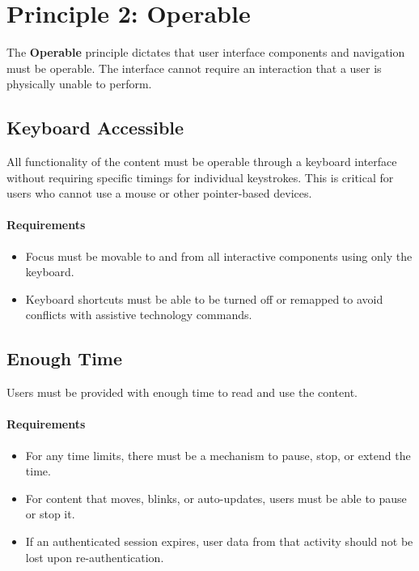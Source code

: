\documentclass{scrbook}
\begin{document}
\section{Principle 2: Operable}

The \textbf{Operable} principle dictates that user interface components and navigation must be operable. The interface cannot require an interaction that a user is physically unable to perform.

\subsection{Keyboard Accessible}
All functionality of the content must be operable through a keyboard interface without requiring specific timings for individual keystrokes. This is critical for users who cannot use a mouse or other pointer-based devices.

\paragraph{Requirements}
\begin{itemize}
    \item Focus must be movable to and from all interactive components using only the keyboard.
    \item Keyboard shortcuts must be able to be turned off or remapped to avoid conflicts with assistive technology commands.
\end{itemize}

\subsection{Enough Time}
Users must be provided with enough time to read and use the content.

\paragraph{Requirements}
\begin{itemize}
    \item For any time limits, there must be a mechanism to pause, stop, or extend the time.
    \item For content that moves, blinks, or auto-updates, users must be able to pause or stop it.
    \item If an authenticated session expires, user data from that activity should not be lost upon re-authentication.
\end{itemize}
\end{document}
